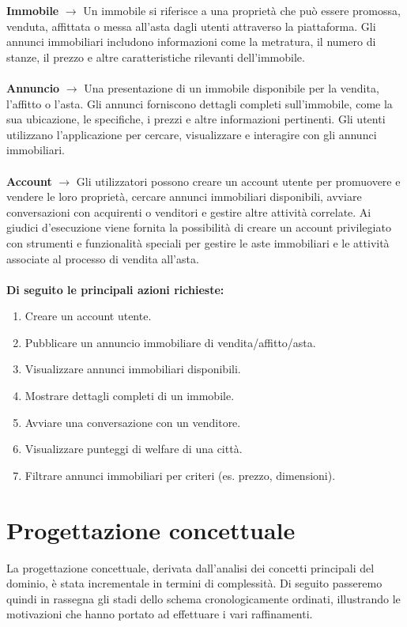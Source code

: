 \documentclass[a4paper,12pt]{report}
\begin{document}
        {\Large \textbf{Immobile}} $\rightarrow$ Un immobile si riferisce a una proprietà che può essere promossa, venduta, affittata o messa all'asta dagli utenti attraverso la piattaforma. Gli annunci immobiliari includono informazioni come la metratura, il numero di stanze, il prezzo e altre caratteristiche rilevanti dell'immobile. \\
        \\
        {\Large \textbf{Annuncio}} $\rightarrow$ Una presentazione di un immobile disponibile per la vendita, l'affitto o l'asta. Gli annunci forniscono dettagli completi sull'immobile, come la sua ubicazione, le specifiche, i prezzi e altre informazioni pertinenti. Gli utenti utilizzano l'applicazione per cercare, visualizzare e interagire con gli annunci immobiliari. \\
        \\
        {\Large \textbf{Account}} $\rightarrow$ Gli utilizzatori possono creare un account utente per promuovere e vendere le loro proprietà, cercare annunci immobiliari disponibili, avviare conversazioni con acquirenti o venditori e gestire altre attività correlate. Ai giudici d'esecuzione viene fornita la possibilità di creare un account privilegiato con strumenti e funzionalità speciali per gestire le aste immobiliari e le attività associate al processo di vendita all'asta. \\
        \\
        \textbf{Di seguito le principali azioni richieste:}
        
        \begin{enumerate}
        \item Creare un account utente.
        \item Pubblicare un annuncio immobiliare di vendita/affitto/asta.
        \item Visualizzare annunci immobiliari disponibili.
        \item Mostrare dettagli completi di un immobile.
        \item Avviare una conversazione con un venditore.
        \item Visualizzare punteggi di welfare di una città.
        \item Filtrare annunci immobiliari per criteri (es. prezzo, dimensioni).
        \end{enumerate}


	\chapter{Progettazione concettuale}
        La progettazione concettuale, derivata dall'analisi dei concetti principali del dominio,
        è stata incrementale in termini di complessità. Di seguito passeremo quindi in rassegna
        gli stadi dello schema cronologicamente ordinati, illustrando le motivazioni che hanno 
        portato ad effettuare i vari raffinamenti. 
\end{document}
